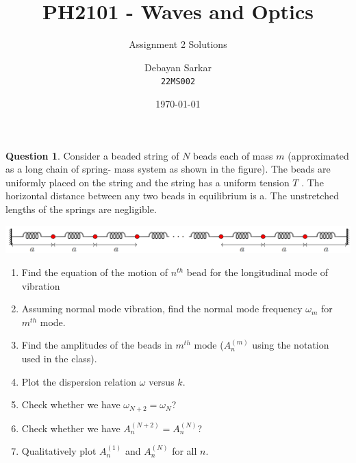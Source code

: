 \documentclass[10pt]{scrartcl}
\title{PH2101 - Waves and Optics}
\subtitle{Assignment 2 Solutions}
\author{Debayan Sarkar \\ \texttt{22MS002}}
\date{\today}
\theoremstyle{definition}
\newtheorem{exercise}{Question}
\begin{document}
\maketitle
\begin{exercise}
    Consider a beaded string of $N$ beads each of mass $m$ (approximated as a long chain of spring-
    mass system as shown in the figure). The beads are uniformly placed on the string and the
    string has a uniform tension $T$ . The horizontal distance between any two beads in equilibrium
    is a. The unstretched lengths of the springs are negligible.

    \includegraphics[width = 6.0in]{q1.png}
    \begin{enumerate}[label={(\alph*)}]
        \item Find the equation of the motion of $n^{th}$ bead for the longitudinal mode of vibration
        \item Assuming normal mode vibration, find the normal mode frequency $\omega_m$ for $m^{th}$ mode.
        \item Find the amplitudes of the beads in $m^{th}$ mode ($A^{(m)}_n$ using the notation used in the class).
        \item Plot the dispersion relation $\omega$ versus $k$.
        \item Check whether we have $\omega_{N+2} = \omega_N$?
        \item Check whether we have $A^{(N +2)}_n = A^{(N)}_n$?
        \item Qualitatively plot $A^{(1)}_n$ and $A^{(N)}_n$ for all $n$.
    \end{enumerate}
\end{exercise}
 
\end{document}
